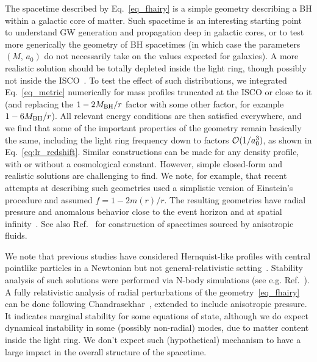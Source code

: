 \documentclass[twocolumn,preprintnumbers,nofootinbib,prd,superscriptaddress,aps]{revtex4-1}
\begin{document}
The spacetime described by Eq.~\eqref{eq_fhairy} is a simple geometry describing a BH within a galactic core of matter. Such spacetime is an interesting starting point to understand GW generation and propagation deep in galactic cores, or to test more generically the geometry of BH spacetimes (in which case the parameters $(M,\,a_0)$ do not necessarily take on the values expected for galaxies).
%
A more realistic solution should be totally depleted inside the light ring, though possibly not inside the ISCO~\cite{Sadeghian:2013laa}.
To test the effect of such distributions, we integrated Eq.~\eqref{eq_metric} numerically for mass profiles truncated at the ISCO or close to it (and replacing the $1-2M_{\rm BH}/r$ factor with some other factor, for example $1-6M_{\rm BH}/r$). All relevant energy conditions are then satisfied everywhere, and we find that some of the important properties of the geometry remain basically the same, including the light ring frequency down to factors ${\cal O}(1/a_0^3)$, as shown in Eq.~\eqref{eq:lr_redshift}. 
%
Similar constructions can be made for any density profile, with or without a cosmological constant. However, simple closed-form and realistic solutions are challenging to find. 
We note, for example, that recent attempts at describing such geometries used a simplistic version of Einstein's procedure and assumed $f=1-2m(r)/r$. The resulting geometries have 
radial pressure and anomalous behavior close to the event horizon and at spatial infinity~\cite{Xu:2018wow}. See also Ref.~\cite{Cadoni:2017evg} for construction of spacetimes sourced by anisotropic fluids.


We note that previous studies have considered Hernquist-like profiles with central pointlike particles in a Newtonian but not general-relativistic setting~\cite{1996ApJ...471...68C,2004MNRAS.351...18B}. Stability analysis of such solutions were performed via N-body simulations (see e.g. Ref.~\cite{Buyle:2006vs}). A fully relativistic analysis of radial perturbations of the geometry~\eqref{eq_fhairy} can be done following Chandrasekhar~\cite{Chandrasekhar:1964zz,1964ApJ...140..417C,1966ApJ...145..505B,Kokkotas:2000up,Dev:2003qd}, extended to include anisotropic pressure.
It indicates marginal stability for some equations of state, although we do expect dynamical instability in some (possibly non-radial) modes, due to matter content inside the light ring. We don't expect such (hypothetical) mechanism to have a large impact in the overall structure of the spacetime.
\end{document}
